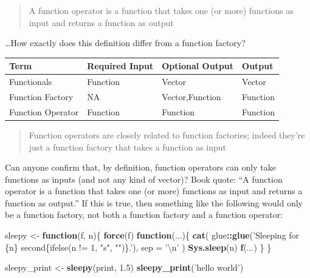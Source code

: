 \documentclass[]{book}
\newenvironment{Shaded}{\begin{snugshade}}{\end{snugshade}}
\newcommand{\CharTok}[1]{\textcolor[rgb]{0.31,0.60,0.02}{#1}}
\newcommand{\ControlFlowTok}[1]{\textcolor[rgb]{0.13,0.29,0.53}{\textbf{#1}}}
\newcommand{\DataTypeTok}[1]{\textcolor[rgb]{0.13,0.29,0.53}{#1}}
\newcommand{\FloatTok}[1]{\textcolor[rgb]{0.00,0.00,0.81}{#1}}
\newcommand{\KeywordTok}[1]{\textcolor[rgb]{0.13,0.29,0.53}{\textbf{#1}}}
\newcommand{\NormalTok}[1]{#1}
\newcommand{\OperatorTok}[1]{\textcolor[rgb]{0.81,0.36,0.00}{\textbf{#1}}}
\newcommand{\StringTok}[1]{\textcolor[rgb]{0.31,0.60,0.02}{#1}}
\begin{document}
\begin{quote}
A function operator is a function that takes one (or more) functions as input and returns a function as output
\end{quote}

\ldots{}How exactly does this definition differ from a function factory?

\captionsetup[table]{labelformat=empty,skip=1pt}
\begin{longtable}{llll}
\toprule
Term & Required Input & Optional Output & Output \\ 
\midrule
Functionals & Function & Vector & Vector \\ 
Function Factory & NA & Vector,Function & Function \\ 
Function Operator & Function & Function & Function \\ 
\bottomrule
\end{longtable}

\begin{quote}
Function operators are closely related to function factories; indeed they're just a function factory that takes a function as input
\end{quote}

Can anyone confirm that, by definition, function operators can only take functions as inputs (and not any kind of vector)? Book quote: ``A function operator is a function that takes one (or more) functions as input and returns a function as output.'' If this is true, then something like the following would only be a function factory, not both a function factory and a function operator:

\begin{Shaded}
\begin{Highlighting}[]
\NormalTok{sleepy <-}\StringTok{ }\ControlFlowTok{function}\NormalTok{(f, n)\{}
  \KeywordTok{force}\NormalTok{(f)}
  \ControlFlowTok{function}\NormalTok{(...)\{}
    \KeywordTok{cat}\NormalTok{(}
\NormalTok{      glue}\OperatorTok{::}\KeywordTok{glue}\NormalTok{(}\StringTok{'Sleeping for \{n\} second\{ifelse(n != 1, "s", "")\}.'}\NormalTok{), }
      \DataTypeTok{sep =} \StringTok{'}\CharTok{\textbackslash{}n}\StringTok{'}
\NormalTok{    )}
    \KeywordTok{Sys.sleep}\NormalTok{(n)}
    \KeywordTok{f}\NormalTok{(...)}
\NormalTok{  \}}
\NormalTok{\}}

\NormalTok{sleepy_print <-}\StringTok{ }\KeywordTok{sleepy}\NormalTok{(print, }\FloatTok{1.5}\NormalTok{)}
\KeywordTok{sleepy_print}\NormalTok{(}\StringTok{'hello world'}\NormalTok{)}
\end{Highlighting}
\end{Shaded}
\end{document}
